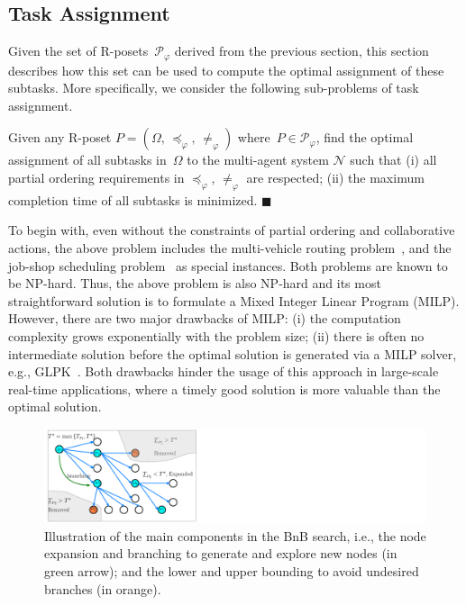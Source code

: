 \subsection{Task Assignment}\label{subsubsec:task-assignment}
Given the set of R-posets~$\mathcal{P}_{\varphi}$ derived from the previous
section, this section describes how this set can be used to compute
the optimal assignment of these subtasks. More specifically, we consider
the following sub-problems of task assignment.

\begin{problem}\label{problem:}
Given any R-poset $P=(\Omega,\, \preceq_{\varphi},\, \neq_{\varphi})$
where~$P\in \mathcal{P}_{\varphi}$,
find the optimal assignment of all subtasks in~$\Omega$ to the multi-agent system
$\mathcal{N}$ such that
(i) all partial ordering requirements in $\preceq_{\varphi},\, \neq_{\varphi}$ are
respected; (ii) the maximum completion time of all subtasks is minimized.
\hfill $\blacksquare$
\end{problem}



To begin with, even without the constraints of partial ordering
and collaborative actions, the above problem includes the multi-vehicle routing
problem~\citep{khamis2015multi},
and the job-shop scheduling problem~\citep{morrison2016branch} as special instances.
Both problems are known to be NP-hard.
Thus, the above problem is also NP-hard and its most straightforward solution
is to formulate a Mixed Integer Linear Program (MILP).
{However, there are two major drawbacks of MILP:
(i) the computation complexity grows exponentially with the problem size;
(ii) there is often no intermediate solution before the optimal solution is generated via a MILP solver,
  e.g., GLPK~\citep{makhorin2008glpk}.
Both drawbacks hinder the usage of this approach in large-scale real-time applications,
where a timely good solution is more valuable than the optimal solution.}

\begin{figure}[t!]
	\centering
	\includegraphics[width=0.9\linewidth]{figures/bnb_graph3.pdf}
	\caption{
		Illustration of the main components in the BnB search,
		i.e., the node expansion and branching to generate and explore new nodes (in green arrow);
		and the lower and upper bounding to avoid undesired branches (in orange).}
	\label{fig:bnb_search_logic}
\end{figure}

